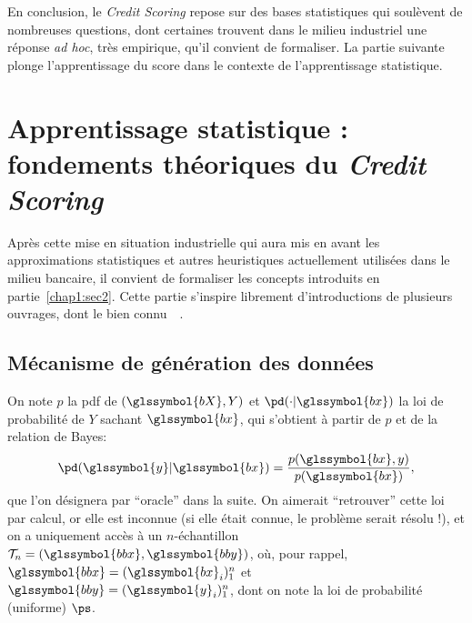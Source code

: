 \medskip

En conclusion, le \textit{Credit Scoring} repose sur des bases statistiques qui soulèvent de nombreuses questions, dont certaines trouvent dans le milieu industriel une réponse \textit{ad hoc}, très empirique, qu'il convient de formaliser. La partie suivante plonge l'apprentissage du \gls{score} dans le contexte de l'apprentissage statistique.

\section{Apprentissage statistique : fondements théoriques du \textit{Credit Scoring}} \label{chap1:sec3}

Après cette mise en situation industrielle qui aura mis en avant les approximations statistiques et autres heuristiques actuellement utilisées dans le milieu bancaire, il convient de formaliser les concepts introduits en partie~\ref{chap1:sec2}. Cette partie s'inspire librement d'introductions de plusieurs ouvrages, dont le bien connu~~\cite{friedman2001elements}.

\subsection{Mécanisme de génération des données}

On note $p$ la \gls{pdf} de $(\glssymbol{bX},Y)$ et $\pd(\cdot | \glssymbol{bx})$ la loi de probabilité de $Y$ sachant $\glssymbol{bx}$, qui s'obtient à partir de $p$ et de la relation de Bayes: $$\pd(\glssymbol{y} | \glssymbol{bx}) = \frac{p(\glssymbol{bx},y)}{p(\glssymbol{bx})},$$ que l'on désignera par ``oracle'' dans la suite. On aimerait ``retrouver'' cette loi par calcul, or elle est inconnue (si elle était connue, le problème serait résolu !), et on a uniquement accès à un $n$-échantillon $\mathcal{T}_n = (\glssymbol{bbx},\glssymbol{bby})$, où, pour rappel, $\glssymbol{bbx} = (\glssymbol{bx}_i)_1^n$ et $\glssymbol{bby} = (\glssymbol{y}_i)_1^n$, dont on note la loi de probabilité (uniforme) $\ps$.

